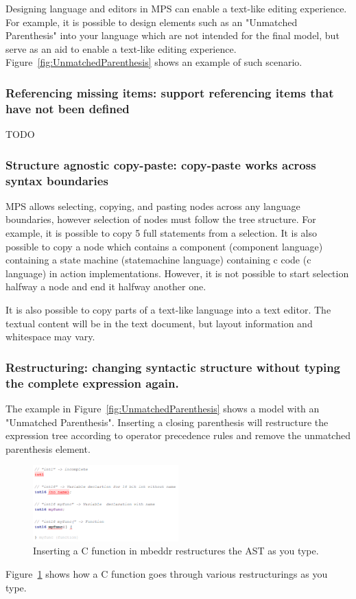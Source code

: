 \documentclass[preprint,numbers,10pt]{sigplanconf}
\begin{document}
Designing language and editors in MPS can enable a text-like editing experience. For example, 
 it is possible to design elements such as an "Unmatched Parenthesis" into your language which are not intended for the final model, but serve as an aid to enable a text-like editing experience.
 Figure~\ref{fig:UnmatchedParenthesis} shows an example of such scenario.


\subsubsection{Referencing missing items: support referencing items that have not been defined}
TODO

\subsubsection{Structure agnostic copy-paste: copy-paste works across syntax boundaries}
MPS allows selecting, copying, and pasting nodes across any language boundaries, however selection of nodes must follow the tree structure. For example, it is possible to copy 5 full statements from a selection. It is also possible to copy a node which contains a component (component language) containing a state machine (statemachine language) containing c code (c language) in action implementations. However, it is not possible to start selection halfway a node and end it halfway another one.

It is also possible to copy parts of a text-like language into a text editor. The textual content will be in the text document, but layout information and whitespace may vary.

\subsubsection{Restructuring: changing syntactic structure without typing the complete expression again.}
The example in Figure~\ref{fig:UnmatchedParenthesis} shows a model with an "Unmatched Parenthesis". Inserting a closing parenthesis will restructure the expression tree according to operator precedence rules and remove the unmatched parenthesis element.

\begin{figure}[H]
	\centering
	\includegraphics[width=0.5\textwidth]{screens/TypeAndRestructure.png}
	\caption{Inserting a C function in mbeddr restructures the AST as you type.}
	\label{fig:TypeAndRestructure}
\end{figure}
Figure~\ref{fig:TypeAndRestructure} shows how a C function goes through various restructurings as you type.
\end{document}
